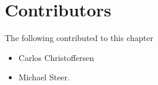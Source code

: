 \section{Contributors}
The following contributed to this chapter
\begin{itemize}
\item[] Carlos Christoffersen
\item[] Michael Steer.
\end{itemize}
